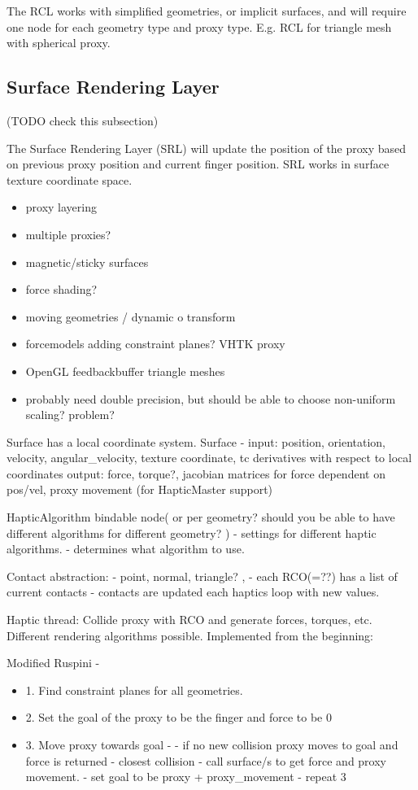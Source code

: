 The RCL works with simplified geometries, or implicit surfaces, and
will require one node for each geometry type and proxy
type. E.g. RCL for triangle mesh with spherical proxy.


\subsection{Surface Rendering Layer}
(TODO check this subsection)

The Surface Rendering Layer (SRL) will update the position of the
proxy based on previous proxy position and current finger
position. SRL works in surface texture coordinate space.

\begin{itemize}
\item proxy layering
\item multiple proxies?
\item magnetic/sticky surfaces
\item force shading?
\item moving geometries / dynamic o transform 
\item forcemodels adding constraint planes? VHTK proxy
\item OpenGL feedbackbuffer triangle meshes
\item probably need double precision, but should be able to choose
non-uniform scaling? problem?
\end{itemize}

Surface has a local coordinate system.
Surface - input: position, orientation, velocity, angular\_velocity,
texture coordinate, tc derivatives with respect to local coordinates
         output: force, torque?, jacobian matrices for force dependent
         on pos/vel, proxy movement (for HapticMaster support)


HapticAlgorithm bindable node( or per geometry? should you be able to
have different algorithms for different geometry? )
- settings for different haptic algorithms.
- determines what algorithm to use.

Contact abstraction:
- point, normal, triangle? , 
- each RCO(=??) has a list of current contacts
- contacts are updated each haptics loop with new values.

Haptic thread:
Collide proxy with RCO and generate forces, torques, etc. Different
rendering algorithms possible. Implemented from the beginning:


Modified Ruspini - 
\begin{itemize}
\item 1. Find constraint planes for all geometries.
\item 2. Set the goal of the proxy to be the finger and force to be 0
\item 3. Move proxy towards goal - 
  - if no new collision proxy moves to goal and force is returned
  - closest collision - call surface/s to get force and proxy movement.
  - set goal to be proxy + proxy\_movement 
  - repeat 3
\end{itemize}


 


